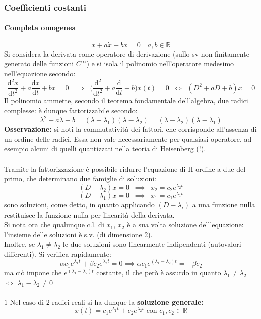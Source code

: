 \documentclass[10pt]{article}
\theoremstyle{plain}
\begin{document}
\subsubsection{Coefficienti costanti}
\paragraph*{Completa omogenea}
\[\ddot x + a \dot x + b x = 0 \quad a,b \in \mathbb{R}\]
Si considera la derivata come operatore di derivazione (sullo sv non finitamente generato delle funzioni $C^{\infty}$) e si isola il polinomio nell'operatore medesimo nell'equazione secondo:
\[\frac{\textrm{d}^2x}{\textrm{d}t^2} + a \frac{\textrm{d}x}{\textrm{d}t} + b x = 0 \enspace \implies \enspace \big(\frac{\textrm{d}^2}{\textrm{d}t^2} + a \frac{\textrm{d}}{\textrm{d}t} + b\big) x(t) = 0 \enspace \Leftrightarrow \enspace (D^2 + aD +b) x = 0\]
Il polinomio ammette, secondo il teorema fondamentale dell'algebra, due radici complesse: è dunque fattorizzabile secondo:
\[\lambda^2 + a\lambda + b = (\lambda - \lambda_1) (\lambda - \lambda_2) = (\lambda - \lambda_2) (\lambda - \lambda_1)\]
\textbf{Osservazione:} si noti la commutatività dei fattori, che corrisponde all'assenza di un ordine delle radici. Essa non vale necessariamente per qualsiasi operatore, ad esempio alcuni di quelli quantizzati nella teoria di Heisenberg (!).
\\~\\Tramite la fattorizzazione è possibile ridurre l'equazione di II ordine a due del primo, che determinano due famiglie di soluzioni:
\[(D - \lambda_2)x = 0 \enspace \implies \enspace x_2 = c_2 e^{\lambda_2 t}\]
\[(D - \lambda_1)x = 0 \enspace \implies \enspace x_1 = c_1 e^{\lambda_1 t}\]
sono soluzioni, come detto, in quanto applicando $(D - \lambda_i)$ a una funzione nulla restituisce la funzione nulla per linearità della derivata.
\\Si nota ora che qualunque c.l. di $x_1$, $x_2$ è a sua volta soluzione dell'equazione: l'insieme delle soluzioni è s.v. (di dimensione 2).
\\Inoltre, se $\lambda_1 \neq \lambda_2$ le due soluzioni sono linearmente indipendenti (autovalori differenti). Si verifica rapidamente:
\[\alpha c_1 e^{\lambda_1 t} + \beta c_2 e^{\lambda_2 t} = 0 \implies \alpha c_1 e^{(\lambda_1-\lambda_2) t} = - \beta c_2\]
ma ciò impone che $e^{(\lambda_1-\lambda_2) t}$ costante, il che però è assurdo in quanto $\lambda_1 \neq \lambda_2$ $\Leftrightarrow$ $\lambda_1 - \lambda_2 \neq 0$
\\~\\$\boxed{1}$ Nel caso di 2 radici reali si ha dunque la \textbf{soluzione generale:}
\[\boxed{x(t) = c_1 e^{\lambda_1 t} + c_2 e^{\lambda_2 t}} \textrm{ con } c_1, c_2 \in \mathbb{R}\]
\end{document}
